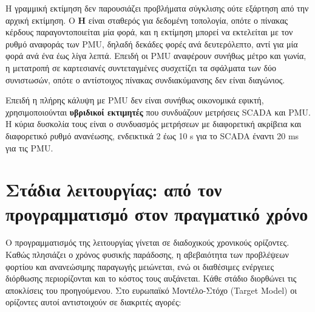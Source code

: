 Η γραμμική εκτίμηση δεν παρουσιάζει προβλήματα σύγκλισης ούτε εξάρτηση από την αρχική
εκτίμηση. Ο $\mathbf{H}$ είναι σταθερός για δεδομένη τοπολογία, οπότε ο πίνακας κέρδους
παραγοντοποιείται μία φορά, και η εκτίμηση μπορεί να εκτελείται με τον ρυθμό αναφοράς των
PMU, δηλαδή δεκάδες φορές ανά δευτερόλεπτο, αντί για μία φορά ανά ένα έως λίγα λεπτά. Επειδή
οι PMU αναφέρουν συνήθως μέτρο και γωνία, η μετατροπή σε καρτεσιανές συντεταγμένες συσχετίζει
τα σφάλματα των δύο συνιστωσών, οπότε ο αντίστοιχος πίνακας συνδιακύμανσης δεν είναι
διαγώνιος.

Επειδή η πλήρης κάλυψη με PMU δεν είναι συνήθως οικονομικά εφικτή, χρησιμοποιούνται
\textbf{υβριδικοί εκτιμητές} που συνδυάζουν μετρήσεις SCADA και PMU. Η κύρια δυσκολία τους
είναι ο συνδυασμός μετρήσεων με διαφορετική ακρίβεια και διαφορετικό ρυθμό ανανέωσης,
ενδεικτικά 2 έως 10 s για το SCADA έναντι 20 ms για τις PMU.

\section{Στάδια λειτουργίας: από τον προγραμματισμό στον πραγματικό χρόνο}
\label{sec:stages}

Ο προγραμματισμός της λειτουργίας γίνεται σε διαδοχικούς χρονικούς ορίζοντες. Καθώς
πλησιάζει ο χρόνος φυσικής παράδοσης, η αβεβαιότητα των προβλέψεων φορτίου και ανανεώσιμης
παραγωγής μειώνεται, ενώ οι διαθέσιμες ενέργειες διόρθωσης περιορίζονται και το κόστος τους
αυξάνεται. Κάθε στάδιο διορθώνει τις αποκλίσεις του προηγούμενου. Στο ευρωπαϊκό
Μοντέλο-Στόχο (Target Model) οι ορίζοντες αυτοί αντιστοιχούν σε διακριτές αγορές:

